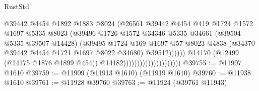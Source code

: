 \begin{lexlean}{RustStd}
\begin{coremodule}
                                                    @39442
                                                    @4454
                                                    @1892
                                                    @1883
                                                    @8024
                                                    (@26561
                                                      @39442
                                                      @4454
                                                      @419
                                                      @1724
                                                      @1572
                                                      @1697
                                                      @5335
                                                      @8023
                                                      (@39496
                                                        @1726
                                                        @1572
                                                        @34346
                                                        @5335
                                                        @34661
                                                        (@39504 @5335 @39507 @14428)
                                                        (@39495
                                                          @1724
                                                          @169
                                                          @1697
                                                          @57
                                                          @8023
                                                          @4838
                                                          (@34370
                                                            @39442
                                                            @4454
                                                            @1721
                                                            @1697
                                                            @8022
                                                            @34680)
                                                          @39512))))))
                                              @14170
                                              (@12499 (@14175 @1876 @1899 @454))
                                              @14182)))))))))))))))))))))
@39755 := @11907 @1610
@39759 := @11909 (@11913 @1610) (@11919 @1610)
@39760 := @11938 @1610
@39761 := @11928 @39760
@39763 := @11924 (@39761 @11943)

\end{coremodule}
\end{lexlean}
